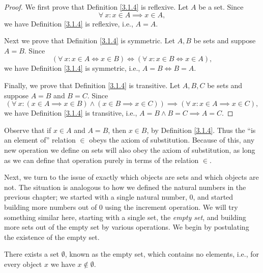 \begin{proof}
    We first prove that Definition \ref{3.1.4} is reflexive.
    Let \(A\) be a set.
    Since
    \[
        \forall\ x : x \in A \implies x \in A,
    \]
    we have Definition \ref{3.1.4} is reflexive, i.e., \(A = A\).

    Next we prove that Definition \ref{3.1.4} is symmetric.
    Let \(A, B\) be sets and suppose \(A = B\).
    Since
    \[
        (\forall\ x : x \in A \iff x \in B) \iff (\forall\ x : x \in B \iff x \in A),
    \]
    we have Definition \ref{3.1.4} is symmetric, i.e., \(A = B \iff B = A\).

    Finally, we prove that Definition \ref{3.1.4} is transitive.
    Let \(A, B, C\) be sets and suppose \(A = B\) and \(B = C\).
    Since
    \[
        (\forall\ x : (x \in A \implies x \in B) \land (x \in B \implies x \in C)) \implies (\forall\ x : x \in A \implies x \in C),
    \]
    we have Definition \ref{3.1.4} is transitive, i.e., \(A = B \land B = C \implies A = C\).
\end{proof}

\begin{note}
    Observe that if \(x \in A\) and \(A = B\), then \(x \in B\), by Definition \ref{3.1.4}.
    Thus the ``is an element of'' relation \(\in\) obeys the axiom of substitution.
    Because of this, any new operation we define on sets will also obey the axiom of substitution, as long as we can define that operation purely in terms of the relation \(\in\).
\end{note}

\begin{note}
    Next, we turn to the issue of exactly which objects are sets and which objects are not.
    The situation is analogous to how we defined the natural numbers in the previous chapter;
    we started with a single natural number, \(0\), and started building more numbers out of \(0\) using the increment operation.
    We will try something similar here, starting with a single set, the \emph{empty set},
    and building more sets out of the empty set by various operations.
    We begin by postulating the existence of the empty set.
\end{note}

\begin{axiom}\label{3.2}
    There exists a set \(\emptyset\), known as the empty set, which contains no elements, i.e., for every object \(x\) we have \(x \notin \emptyset\).
\end{axiom}

